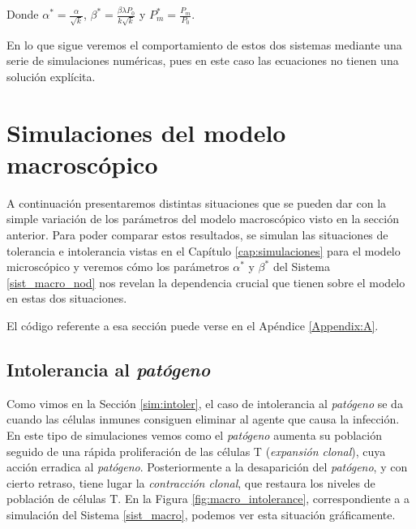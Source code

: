Donde $\alpha^{*} = \frac{\alpha}{\sqrt k}$, $\beta^{*} = \frac{\beta \lambda P_0}{k \sqrt k}$ y $P_{m}^{*} = \frac{P_m}{P_0}$.

En lo que sigue veremos el comportamiento de estos dos sistemas mediante una serie de simulaciones numéricas, pues en este caso las ecuaciones no tienen una solución explícita.

\section{Simulaciones del modelo macroscópico}
\label{sec:simu_macro}

A continuación presentaremos distintas situaciones que se pueden dar con la simple variación de los parámetros del modelo macroscópico visto en la sección anterior. Para poder comparar estos resultados, se simulan las situaciones de tolerancia e intolerancia vistas en el Capítulo \ref{cap:simulaciones} para el modelo microscópico y veremos cómo los parámetros $\alpha^{*}$ y $\beta^{*}$ del Sistema \ref{sist_macro_nod} nos revelan la dependencia crucial que tienen sobre el modelo en estas dos situaciones.

El código referente a esa sección puede verse en el Apéndice \ref{Appendix:A}.



\subsection{Intolerancia al \textit{patógeno}}
\label{sub:simMacroIntoler}

Como vimos en la Sección \ref{sim:intoler}, el caso de intolerancia al \textit{patógeno} se da cuando las células inmunes consiguen eliminar al agente que causa la infección. 
En este tipo de simulaciones vemos como el \textit{patógeno} aumenta su población seguido de una rápida proliferación de las células T (\textit{expansión clonal}), cuya acción erradica al \textit{patógeno}. Posteriormente a la desaparición del \textit{patógeno}, y con cierto retraso, tiene lugar la \textit{contracción clonal}, que restaura los niveles de población de células T. En la Figura \ref{fig:macro_intolerance}, correspondiente a a simulación del Sistema \ref{sist_macro}, podemos ver esta situación gráficamente. 

